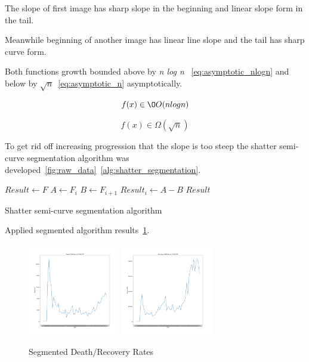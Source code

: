 The slope of first image has sharp slope in the beginning and linear slope form in the tail.

Meanwhile beginning of another image has linear line slope and the tail has sharp curve form.

Both functions growth bounded above by {\textit{n log n} }~\ref{eq:asymptotic_nlogn} and below by $\sqrt{n}$~\ref{eq:asymptotic_n} asymptotically.

\begin{equation}
    f(x) \in \O O(n log n)
    \label{eq:asymptotic_nlogn}
\end{equation}

\begin{equation}
    f(x) \in \Omega (\sqrt{n})
    \label{eq:asymptotic_n}
\end{equation}

To get rid off increasing progression that the slope is too steep the shatter semi-curve segmentation algorithm was developed~\ref{fig:raw_data}~\ref{alg:shatter_segmentation}.

\begin{algorithm}[h]
    \begin{algorithmic}
	    \State $Result \gets F$
                \State $A \gets F_i$
                \State $B \gets F_{i+1}$
                \State $Result_i \gets A- B $
            \EndFor
            \State \Return $Result $
        \EndFunction
    \end{algorithmic}
    \caption{Shatter semi-curve segmentation algorithm}
    \label{alg:shatter_segmentation}
\end{algorithm}

Applied segmented algorithm results~\ref{fig:segmentated_data}.

\begin{figure}[h]
    \includegraphics*[width=4cm, height=4cm]{../src/output/death-diff.png}
    \includegraphics*[width=4cm, height=4cm]{../src/output/recovery-diff.png}
    \caption{Segmented Death/Recovery Rates}
    \label{fig:segmentated_data}
\end{figure}

